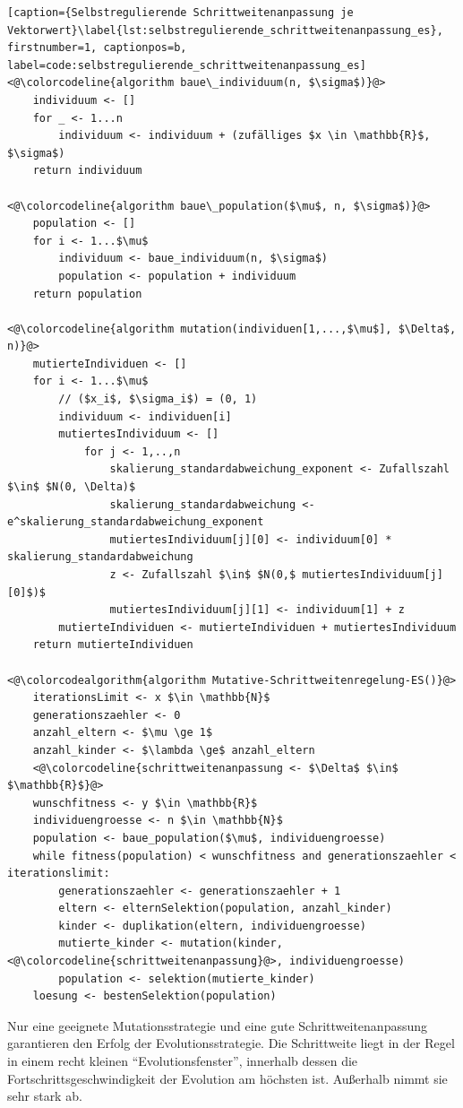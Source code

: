 \begin{lstlisting}[caption={Selbstregulierende Schrittweitenanpassung je Vektorwert}\label{lst:selbstregulierende_schrittweitenanpassung_es}, firstnumber=1, captionpos=b, label=code:selbstregulierende_schrittweitenanpassung_es]
<@\colorcodeline{algorithm baue\_individuum(n, $\sigma$)}@>
	individuum <- []
	for _ <- 1...n
		individuum <- individuum + (zufälliges $x \in \mathbb{R}$, $\sigma$)
	return individuum
	
<@\colorcodeline{algorithm baue\_population($\mu$, n, $\sigma$)}@>
	population <- []
	for i <- 1...$\mu$
		individuum <- baue_individuum(n, $\sigma$)
		population <- population + individuum
	return population

<@\colorcodeline{algorithm mutation(individuen[1,...,$\mu$], $\Delta$, n)}@>
	mutierteIndividuen <- []
	for i <- 1...$\mu$
		// ($x_i$, $\sigma_i$) = (0, 1)
		individuum <- individuen[i]
		mutiertesIndividuum <- []
			for j <- 1,..,n
				skalierung_standardabweichung_exponent <- Zufallszahl $\in$ $N(0, \Delta)$
				skalierung_standardabweichung <- e^skalierung_standardabweichung_exponent
				mutiertesIndividuum[j][0] <- individuum[0] * skalierung_standardabweichung
				z <- Zufallszahl $\in$ $N(0,$ mutiertesIndividuum[j][0]$)$
				mutiertesIndividuum[j][1] <- individuum[1] + z
		mutierteIndividuen <- mutierteIndividuen + mutiertesIndividuum
	return mutierteIndividuen

<@\colorcodealgorithm{algorithm Mutative-Schrittweitenregelung-ES()}@>
	iterationsLimit <- x $\in \mathbb{N}$
	generationszaehler <- 0
	anzahl_eltern <- $\mu \ge 1$
	anzahl_kinder <- $\lambda \ge$ anzahl_eltern
	<@\colorcodeline{schrittweitenanpassung <- $\Delta$ $\in$ $\mathbb{R}$}@>
	wunschfitness <- y $\in \mathbb{R}$
	individuengroesse <- n $\in \mathbb{N}$
	population <- baue_population($\mu$, individuengroesse)
	while fitness(population) < wunschfitness and generationszaehler < iterationslimit:
		generationszaehler <- generationszaehler + 1
		eltern <- elternSelektion(population, anzahl_kinder)
		kinder <- duplikation(eltern, individuengroesse)
		mutierte_kinder <- mutation(kinder, <@\colorcodeline{schrittweitenanpassung}@>, individuengroesse)
		population <- selektion(mutierte_kinder)
	loesung <- bestenSelektion(population)
\end{lstlisting}

Nur eine geeignete Mutationsstrategie und eine gute Schrittweitenanpassung garantieren den Erfolg der Evolutionsstrategie.
Die Schrittweite liegt in der Regel in einem recht kleinen \enquote{Evolutionsfenster}, innerhalb dessen die Fortschrittsgeschwindigkeit der Evolution am höchsten ist. Außerhalb nimmt sie sehr stark ab.
